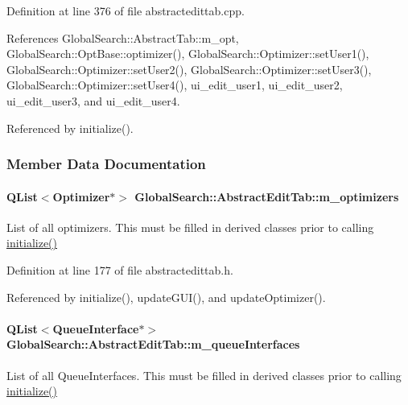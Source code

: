 Definition at line 376 of file abstractedittab.\+cpp.



References Global\+Search\+::\+Abstract\+Tab\+::m\+\_\+opt, Global\+Search\+::\+Opt\+Base\+::optimizer(), Global\+Search\+::\+Optimizer\+::set\+User1(), Global\+Search\+::\+Optimizer\+::set\+User2(), Global\+Search\+::\+Optimizer\+::set\+User3(), Global\+Search\+::\+Optimizer\+::set\+User4(), ui\+\_\+edit\+\_\+user1, ui\+\_\+edit\+\_\+user2, ui\+\_\+edit\+\_\+user3, and ui\+\_\+edit\+\_\+user4.



Referenced by initialize().



\subsubsection{Member Data Documentation}
\hypertarget{classGlobalSearch_1_1AbstractEditTab_a91f1cbcdf3321b4502aaa11074559eba}{}
\paragraph[{m\+\_\+optimizers}]{\setlength{\rightskip}{0pt plus 5cm}Q\+List$<${\bf Optimizer}$\ast$$>$ Global\+Search\+::\+Abstract\+Edit\+Tab\+::m\+\_\+optimizers\hspace{0.3cm}{\ttfamily [protected]}}\label{classGlobalSearch_1_1AbstractEditTab_a91f1cbcdf3321b4502aaa11074559eba}
List of all optimizers. This must be filled in derived classes prior to calling \hyperlink{classGlobalSearch_1_1AbstractEditTab_afb9fd8fbcf71d7287a8117ce4d75a00b}{initialize()} 

Definition at line 177 of file abstractedittab.\+h.



Referenced by initialize(), update\+G\+U\+I(), and update\+Optimizer().

\hypertarget{classGlobalSearch_1_1AbstractEditTab_a364845072bfc0409a145c1cd6b60a60a}{}
\paragraph[{m\+\_\+queue\+Interfaces}]{\setlength{\rightskip}{0pt plus 5cm}Q\+List$<${\bf Queue\+Interface}$\ast$$>$ Global\+Search\+::\+Abstract\+Edit\+Tab\+::m\+\_\+queue\+Interfaces\hspace{0.3cm}{\ttfamily [protected]}}\label{classGlobalSearch_1_1AbstractEditTab_a364845072bfc0409a145c1cd6b60a60a}
List of all Queue\+Interfaces. This must be filled in derived classes prior to calling \hyperlink{classGlobalSearch_1_1AbstractEditTab_afb9fd8fbcf71d7287a8117ce4d75a00b}{initialize()} 


